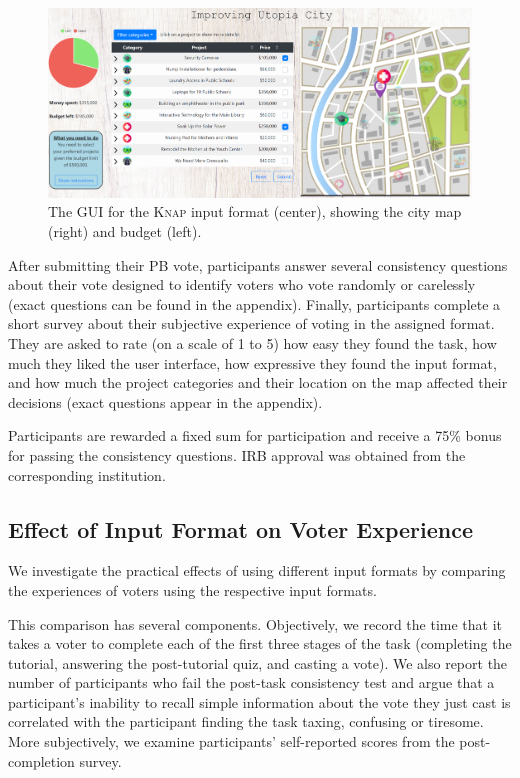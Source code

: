 \documentclass[mnsc,blindrev]{informs3_freeuse} %
\newcommand{\kibitz}[2]{\ifnum\Comments=1{\color{#1}{#2}}\fi}
\newcommand{\gb}[1]{\kibitz{red}{[GB:#1]}}
\newcommand{\knap}{\textsc{Knap}}
\begin{document}
  \begin{figure}[h]
\begin{center}
\includegraphics[clip, trim=0 3mm 0 0, width=15cm]{../experiment/full system.PNG}
\caption{The GUI for the \knap{}  input format (center), showing  the city map (right) and budget (left).
}\label{fig:interface}
\end{center}
\end{figure}
 
 After   submitting their PB vote, participants  answer several consistency questions about their vote      designed to identify voters who vote randomly or carelessly (exact questions can be found in the appendix).\gb{note-appendix}
 Finally, participants   complete a short survey about their subjective experience of voting in the assigned format. They are asked to rate (on a scale of 1 to 5) how easy they found the task, how much they liked the user interface,   how   expressive  they found the input format,  and how much the project categories and their location on the map    affected their decisions (exact questions appear in the appendix). \gb{note-appendix} 
 
 Participants are rewarded a  fixed sum    for participation and  receive a 75\% bonus for passing the  consistency questions.  IRB approval was obtained from the corresponding institution. 

 

\subsection{Effect of Input Format on Voter Experience} 

 
We investigate the practical effects of using different input formats by comparing  the experiences of voters using the respective input formats.

This comparison has several components. Objectively, we record the time that it takes a voter to complete each of the first three stages of the task (completing the tutorial, answering the post-tutorial quiz, and casting a vote).  
We also report the number  of participants who fail the post-task consistency test and argue that a participant's inability  to recall simple information about the vote they just cast is correlated with the participant finding the task taxing, confusing or tiresome. 
More subjectively, we examine participants' self-reported scores from the post-completion survey.  
\end{document}
